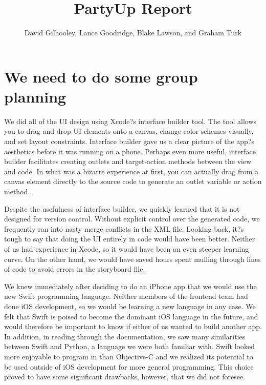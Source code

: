 \documentclass[12pt]{article}
\title{PartyUp Report}
\author{David Gilhooley, Lance Goodridge, Blake Lawson, and Graham Turk}
\begin{document}
\pagestyle{plain}

\maketitle

\section{We need to do some group planning}

We did all of the UI design using Xcode?s interface builder tool. The tool allows you to drag and drop UI elements onto a canvas, change color schemes visually, and set layout constraints. Interface builder gave us a clear picture of the app?s aesthetics before it was running on a phone. Perhaps even more useful, interface builder facilitates creating outlets and target-action methods between the view and code. In what was a bizarre experience at first, you can actually drag from a canvas element directly to the source code to generate an outlet variable or action method. 

\bigskip

Despite the usefulness of interface builder, we quickly learned that it is not designed for version control. Without explicit control over the generated code, we frequently ran into nasty merge conflicts in the XML file. Looking back, it?s tough to say that doing the UI entirely in code would have been better. Neither of us had experience in Xcode, so it would have been an even steeper learning curve. On the other hand, we would have saved hours spent mulling through lines of code to avoid errors in the storyboard file. 

\bigskip

We knew immediately after deciding to do an iPhone app that we would use the new Swift programming language. Neither members of the frontend team had done iOS development, so we would be learning a new language in any case. We felt that Swift is poised to become the dominant iOS language in the future, and would therefore be important to know if either of us wanted to build another app. In addition, in reading through the documentation, we saw many similarities between Swift and Python, a language we were both familiar with. Swift looked more enjoyable to program in than Objective-C and we realized its potential to be used outside of iOS development for more general programming. This choice proved to have some significant drawbacks, however, that we did not foresee. 
\end{document}
